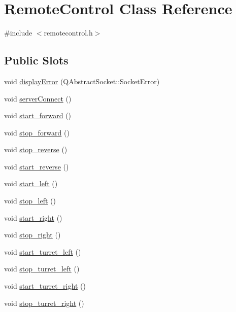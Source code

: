 \hypertarget{classRemoteControl}{
\section{RemoteControl Class Reference}
\label{classRemoteControl}
}


{\ttfamily \#include $<$remotecontrol.h$>$}

\subsection*{Public Slots}
\begin{DoxyCompactItemize}
\item 
void \hyperlink{classRemoteControl_a234b150f3acba1d58304808cc491b5ae}{displayError} (QAbstractSocket::SocketError)
\item 
void \hyperlink{classRemoteControl_a7ef0102f355b064763f24866ad6835a9}{serverConnect} ()
\item 
void \hyperlink{classRemoteControl_ab51924404f873141d986d609bdc8a879}{start\_\-forward} ()
\item 
void \hyperlink{classRemoteControl_a55857c188244a29baf0ff40ad5df3be2}{stop\_\-forward} ()
\item 
void \hyperlink{classRemoteControl_a148de9c23fb47748ebfd00f7b282974c}{stop\_\-reverse} ()
\item 
void \hyperlink{classRemoteControl_ae949b1a1afc3e9773583f317b57b25ba}{start\_\-reverse} ()
\item 
void \hyperlink{classRemoteControl_adea74e96812a0662d0a5eeefb62bd1d3}{start\_\-left} ()
\item 
void \hyperlink{classRemoteControl_a02e86cc3fface3d3ea33d62a7df30acb}{stop\_\-left} ()
\item 
void \hyperlink{classRemoteControl_ae9ad61b2c6c8bba551fcb26064f64a6b}{start\_\-right} ()
\item 
void \hyperlink{classRemoteControl_af7e0d46e7824d3e6483b55d887f23063}{stop\_\-right} ()
\item 
void \hyperlink{classRemoteControl_ac173cecf6ee35e4b43794ee4cc4c673d}{start\_\-turret\_\-left} ()
\item 
void \hyperlink{classRemoteControl_afeb9cfe8a1c8e3dc1a89c039378417a4}{stop\_\-turret\_\-left} ()
\item 
void \hyperlink{classRemoteControl_a0d6571c7485a67ea19e0503cbe91906e}{start\_\-turret\_\-right} ()
\item 
void \hyperlink{classRemoteControl_a856d98499b4b6b4d9374b6bd43f9bc0b}{stop\_\-turret\_\-right} ()

\end{DoxyCompactItemize}
